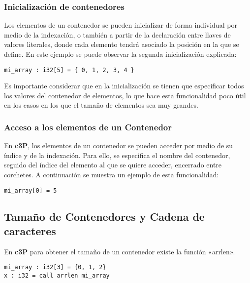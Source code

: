 \subsubsection{Inicialización de contenedores}

Los elementos de un contenedor se pueden inicializar de forma individual por medio de
la indexación, o también a partir de la declaración entre llaves de valores literales,
donde cada elemento tendrá asociado la posición en la que se define. En este ejemplo
se puede observar la segunda inicialización explicada:

\begin{verbatim}
mi_array : i32[5] = { 0, 1, 2, 3, 4 }
\end{verbatim}

Es importante considerar que en la inicialización se tienen que especificar todos los
valores del contenedor de elementos, lo que hace esta funcionalidad poco útil en
los casos en los que el tamaño de elementos sea muy grandes.

\subsubsection{Acceso a los elementos de un Contenedor}

En \textbf{c3P}, los elementos de un contenedor se pueden acceder por medio de su índice y
de la indexación. Para ello, se especifica el nombre del contenedor, seguido del índice del
elemento al que se quiere acceder, encerrado entre corchetes. A continuación se muestra un
ejemplo de esta funcionalidad:

\begin{verbatim}
mi_array[0] = 5
\end{verbatim}

\subsection{Tamaño de Contenedores y Cadena de caracteres}

En \textbf{c3P} para obtener el tamaño de un contenedor existe la función «arrlen».

\begin{verbatim}
mi_array : i32[3] = {0, 1, 2}
x : i32 = call arrlen mi_array
\end{verbatim}
